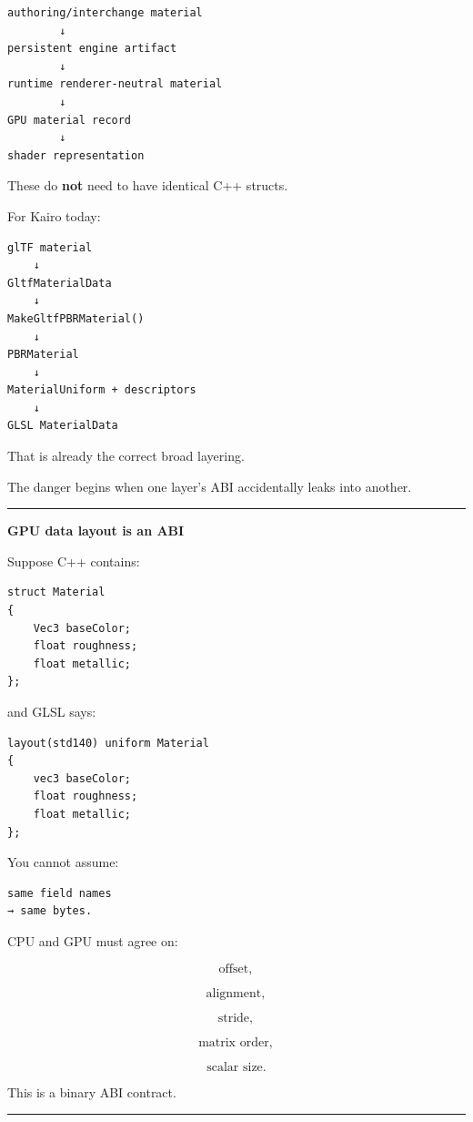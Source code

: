 \begin{verbatim}
authoring/interchange material
        ↓
persistent engine artifact
        ↓
runtime renderer-neutral material
        ↓
GPU material record
        ↓
shader representation
\end{verbatim}

These do \textbf{not} need to have identical C++ structs.

For Kairo today:

\begin{verbatim}
glTF material
    ↓
GltfMaterialData
    ↓
MakeGltfPBRMaterial()
    ↓
PBRMaterial
    ↓
MaterialUniform + descriptors
    ↓
GLSL MaterialData
\end{verbatim}

That is already the correct broad layering.

The danger begins when one layer's ABI accidentally leaks into another.

\begin{center}\rule{0.5\linewidth}{0.5pt}\end{center}

\textbf{GPU data layout is an ABI}

Suppose C++ contains:

\begin{verbatim}
struct Material
{
    Vec3 baseColor;
    float roughness;
    float metallic;
};
\end{verbatim}

and GLSL says:

\begin{verbatim}
layout(std140) uniform Material
{
    vec3 baseColor;
    float roughness;
    float metallic;
};
\end{verbatim}

You cannot assume:

\begin{verbatim}
same field names
→ same bytes.
\end{verbatim}

CPU and GPU must agree on:

\[
\text{offset},
\]

\[
\text{alignment},
\]

\[
\text{stride},
\]

\[
\text{matrix order},
\]

\[
\text{scalar size}.
\]

This is a binary ABI contract.

\begin{center}\rule{0.5\linewidth}{0.5pt}\end{center}


